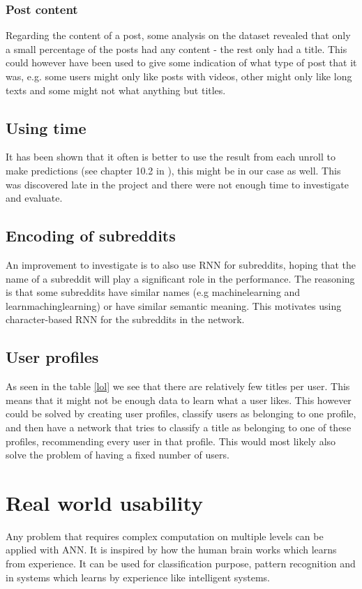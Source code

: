 \subsubsection{Post content}
Regarding the content of a post, some analysis on the dataset revealed that only a small percentage of the posts had any content - the rest only had a title. This could however have been used to give some indication of what type of post that it was, e.g. some users might only like posts with videos, other might only like long texts and some might not what anything but titles.

\subsection{Using time}
It has been shown that it often is better to use the result from each unroll to make predictions (see chapter 10.2 in \parencite{Goodfellow-et-al-2016}), this might be in our case as well. This was discovered late in the project and there were not enough time to investigate and evaluate.

\subsection{Encoding of subreddits}
An improvement to investigate is to also use RNN for subreddits, hoping that the name of a subreddit will play a significant role in the performance. The reasoning is that some subreddits have similar names (e.g machinelearning and learnmachinglearning) or have similar semantic meaning. This motivates using character-based RNN for the subreddits in the network.

\subsection{User profiles}
As seen in the table \ref{lol} we see that there are relatively few titles per user. This means that it might not be enough data to learn what a user likes. This however could be solved by creating user profiles, classify users as belonging to one profile, and then have a network that tries to classify a title as belonging to one of these profiles, recommending every user in that profile. This would most likely also solve the problem of having a fixed number of users.

\section{Real world usability}
Any problem that requires complex computation on multiple levels can be applied with ANN. It is inspired by how the human brain works which learns from experience. It can be used for classification purpose, pattern recognition and in systems which learns by experience like intelligent systems.  

